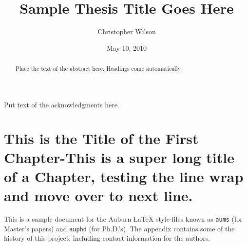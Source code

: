 \documentclass[12pt]{report}
\title{Sample Thesis Title Goes Here}
\author{Christopher Wilson}
\date{May 10, 2010} %
\begin{document}
\begin{romanpages}      %

  \TitlePage

  \begin{abstract}
    Place the text of the abstract here. Headings come automatically.
  \end{abstract}

  \begin{acknowledgments}
    Put text of the acknowledgments here.
  \end{acknowledgments}

  \begin{singlespace}

    \begin{center}
      \renewcommand{\cftchapfont}{}
      \renewcommand{\cftchappagefont}{}
      \renewcommand{\cfttoctitlefont}{\normalsize}%
      \renewcommand{\cftsecfont }{\normalsize}%
      \renewcommand{\cftsecpagefont}{\normalsize}%
      \tableofcontents
      \newpage
      \renewcommand{\cftchapfont}{}
      \renewcommand{\cftchappagefont}{}
      \renewcommand{\cftloftitlefont}{\normalsize}%
      \renewcommand{\cftsecfont}{\normalsize}%
      \renewcommand{\cftsecpagefont}{\normalsize}%
      \listoffigures
      \newpage
      \renewcommand{\cftchapfont}{}
      \renewcommand{\cftchappagefont}{}
      \renewcommand{\cftlottitlefont}{\normalsize}%
      \renewcommand{\cftsecfont}{\normalsize}%
      \renewcommand{\cftsecpagefont}{\normalsize}%
      \listoftables
    \end{center}
  \end{singlespace}

  \printnomenclature[0.5in] %
\end{romanpages}        %


\normalem       %

\chapter { This is the Title of the First Chapter-This is a super long title of a Chapter, testing the line wrap and move over to next line.}  %
\vspace{-1cm} %
This is a sample document for the Auburn  \LaTeX{} style-files known
as {\tt aums} (for Master's papers) and {\tt auphd} (for Ph.D.'s).
The appendix contains some of the history of this project, including
contact information for the authors.
\end{document}
